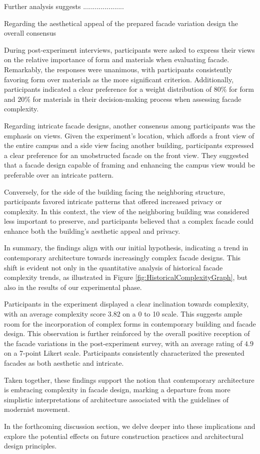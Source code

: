 Further analysis suggests .....................

Regarding the aesthetical appeal of the prepared facade variation design the overall consensus


During post-experiment interviews, participants were asked to express their views on the relative importance of form and materials when evaluating facade.
Remarkably, the responses were unanimous, with participants consistently favoring form over materials as the more significant criterion.
Additionally, participants indicated a clear preference for a weight distribution of \(80\%\) for form and \(20\%\) for materials in their decision-making process when assessing facade complexity.

Regarding intricate facade designs, another consensus among participants was the emphasis on views.
Given the experiment's location, which affords a front view of the entire campus and a side view facing another building, participants expressed a clear preference for an unobstructed facade on the front view.
They suggested that a facade design capable of framing and enhancing the campus view would be preferable over an intricate pattern.

Conversely, for the side of the building facing the neighboring structure, participants favored intricate patterns that offered increased privacy or complexity.
In this context, the view of the neighboring building was considered less important to preserve, and participants believed that a complex facade could enhance both the building's aesthetic appeal and privacy.


In summary, the findings align with our initial hypothesis, indicating a trend in contemporary architecture towards increasingly complex facade designs.
This shift is evident not only in the quantitative analysis of historical facade complexity trends, as illustrated in Figure \ref{fig:HistoricalComplexityGraph}, but also in the results of our experimental phase.

Participants in the experiment displayed a clear inclination towards complexity, with an average complexity score \(3.82\) on a 0 to 10 scale.
This suggests ample room for the incorporation of complex forms in contemporary building and facade design.
This observation is further reinforced by the overall positive reception of the facade variations in the post-experiment survey, with an average rating of \(4.9\) on a 7-point Likert scale.
Participants consistently characterized the presented facades as both aesthetic and intricate.

Taken together, these findings support the notion that contemporary architecture is embracing complexity in facade design, marking a departure from more simplistic interpretations of architecture associated with the guidelines of modernist movement.

In the forthcoming discussion section, we delve deeper into these implications and explore the potential effects on future construction practices and architectural design principles.



